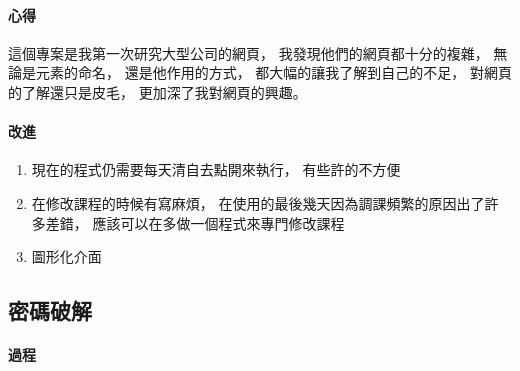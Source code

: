 \documentclass[12pt,oneside]{ctexart}
\begin{document}
\paragraph{心得}
\begin{adjustwidth}{2em}{0em}
這個專案是我第一次研究大型公司的網頁，
我發現他們的網頁都十分的複雜，
無論是元素的命名，
還是他作用的方式，
都大幅的讓我了解到自己的不足，
對網頁的了解還只是皮毛，
更加深了我對網頁的興趣。
\end{adjustwidth}
\paragraph{改進}
\begin{adjustwidth}{2em}{0em}
\begin{enumerate}
    \item
        現在的程式仍需要每天清自去點開來執行，
        有些許的不方便
    \item 
        在修改課程的時候有寫麻煩，
        在使用的最後幾天因為調課頻繁的原因出了許多差錯，
        應該可以在多做一個程式來專門修改課程
    \item  
        圖形化介面
\end{enumerate}
\end{adjustwidth}



\clearpage
\subsection{ 密碼破解 }


\paragraph{ 過程 }
\end{document}
